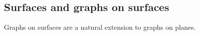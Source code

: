 \subsection{Surfaces and graphs on surfaces}
Graphs on surfaces are a natural extension to graphs on planes.
